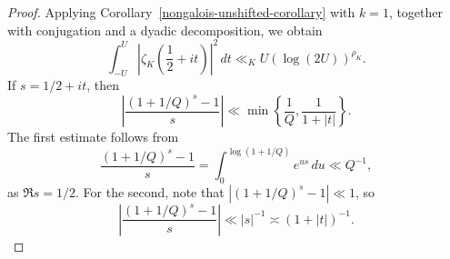 \documentclass[twoside,reqno,11pt,a4paper]{amsart}
\numberwithin{equation}{section}
\theoremstyle{plain}
\theoremstyle{definition}
\theoremstyle{remark}
\begin{document}
\begin{proof}
Applying Corollary~\ref{nongalois-unshifted-corollary} with $k=1$, together with conjugation and a dyadic decomposition, we obtain
\begin{equation*}
\int_{-U}^{U}\left|\zeta_K\left(\frac12+it\right)\right|^2\,dt
\ll_K U\left(\log(2U)\right)^{\rho_K}.
\end{equation*}
If $s=1/2+it$, then
\begin{equation*}
\left|\frac{(1+1/Q)^s-1}{s}\right|
\ll\min\left\{\frac1Q,\frac1{1+|t|}\right\}.
\end{equation*}
The first estimate follows from
\begin{equation*}
    \frac{(1+1/Q)^s-1}{s}
=\int_0^{\log(1+1/Q)}e^{us}\,du \ll Q^{-1},
\end{equation*}
as $\Re s=1/2$. For the second, note that
$|(1+1/Q)^s-1|\ll1$,
so
\begin{equation*}
    \left|\frac{(1+1/Q)^s-1}{s}\right|
\ll |s|^{-1}
\asymp (1+|t|)^{-1}.
\end{equation*}


\end{proof}
\end{document}
